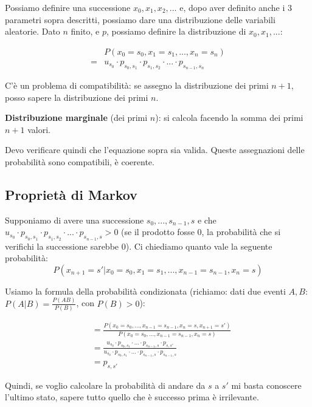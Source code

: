 \documentclass[a4paper,12pt]{book}
\begin{document}
Possiamo definire una successione $ x_0, x_1, x_2, ... $ e, dopo aver definito anche i 3 parametri sopra descritti, possiamo dare una distribuzione delle variabili aleatorie. Dato $ n $ finito, e $ p $, possiamo definire la distribuzione di $ x_0, x_1, ... $:

\begin{align*}
	& P(x_0 = s_0, x_1 = s_1, ..., x_n = s_n) \\
	= & u_{s_0} \cdot p_{s_0, s_1} \cdot p_{s_1, s_2} \cdot ... \cdot p_{s_{n-1}, s_n}
\end{align*}

C'è un problema di compatibilità: se assegno la distribuzione dei primi $ n+1 $, posso sapere la distribuzione dei primi $ n $. %

\textbf{Distribuzione marginale} (dei primi $ n $): si calcola facendo la somma dei primi $ n+1 $ valori. 

Devo verificare quindi che l'equazione sopra sia valida. %
Queste assegnazioni delle probabilità sono compatibili, è coerente. 

\subsection{Proprietà di Markov}
Supponiamo di avere una successione $ s_0, ..., s_{n-1}, s $
e che $ u_{s_0} \cdot p_{s_0, s_1} \cdot p_{s_1, s_2} \cdot ... \cdot p_{s_{n-1}, s}  > 0 $ (se il prodotto fosse 0, la probabilità che si verifichi la successione sarebbe 0). 
Ci chiediamo quanto vale la seguente probabilità:
$$ P(x_{n+1} = s' | x_0 = s_0, x_1 = s_1, ..., x_{n-1} = s_{n-1}, x_n = s) $$

Usiamo la formula della probabilità condizionata (richiamo: dati due eventi $ A, B $: $ P(A|B) = \frac{P(AB)}{P(B)} $, con $ P(B) > 0 $):

\begin{align*}
	& = \frac{P(x_0 = s_0, ..., x_{n-1} = s_{n-1}, x_n = s, x_{n+1} = s')}{P(x_0 = s_0, ..., x_{n-1} = s_{n-1}, x_n = s)} \\
	& = \frac{u_{s_0}\cdot p_{s_0, s_1} \cdot ... \cdot p_{s_{n-1}, s} \cdot p_{s,s'}}{u_{s_0}\cdot p_{s_0, s_1} \cdot ... \cdot p_{s_{n-1}, s} \cdot p_{s_{n-1},s}}\\
	& = p_{s,s'}
\end{align*}

Quindi, se voglio calcolare la probabilità di andare da $ s $ a $ s' $ mi basta conoscere l'ultimo stato, sapere tutto quello che è successo prima è irrilevante. 
\end{document}
